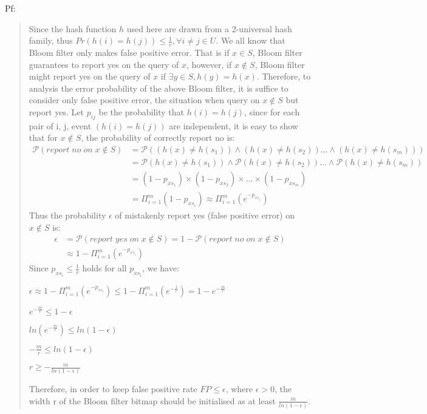 \documentclass[12pt]{article}
\begin{document}
Pf: 
\begin{quote}
Since the hash function $h$ used here are drawn from a 2-universal hash family, thus $Pr(h(i) = h(j)) \leq \frac{1}{r}, \forall i \neq j \in U$. We all know that Bloom filter only makes false positive error. That is if $x \in S$, Bloom filter guarantees to report yes on the query of $x$, however, if $x \notin S$, Bloom filter might report yes on the query of $x$ if $\exists y \in S, h(y) = h(x)$. Therefore, to analysis the error probability of the above Bloom filter, it is suffice to consider only false positive error, the situation when query on $x \notin S$ but report yes. Let $p_{ij}$ be the probability that $h(i) = h(j)$, since for each pair of i, j, event $(h(i) = h(j))$ are independent, it is easy to show that for $x \notin S$, the probability of correctly report no is:
\begin{equation}
\begin{aligned}
\mathcal{P}(report \; no \; on \; x \notin S) &= \mathcal{P}((h(x) \neq h(s_1)) \land (h(x) \neq h(s_2)) \dots \land (h(x) \neq h(s_m))) \\
&=  \mathcal{P}(h(x) \neq h(s_1)) \land \mathcal{P}(h(x) \neq h(s_2)) \dots \land \mathcal{P}(h(x) \neq h(s_m))\\
&= (1-p_{xs_1}) \times (1-p_{xs_2}) \times \dots \times (1-p_{xs_m}) \\ 
&= \Pi_{i=1}^m(1-p_{xs_i}) \approx \Pi_{i=1}^m(e^{-p_{xs_i}})
\end{aligned}
\end{equation}
Thus the probability $\epsilon$ of mistakenly report yes (false positive error) on $x \notin S$ is:
\begin{equation}
\begin{aligned}
\epsilon &= \mathcal{P}(report \; yes \; on \; x \notin S) = 1 - \mathcal{P}(report \; no \; on \; x \notin S) \\
&\approx  1 - \Pi_{i=1}^m(e^{-p_{xs_i}})
\end{aligned}
\end{equation}
Since $p_{xs_i} \leq \frac{1}{r}$ holds for all $p_{xs_i}$, we have:
\begin{center}
$\epsilon \approx 1 - \Pi_{i=1}^m(e^{-p_{xs_i}}) \leq 1 - \Pi_{i=1}^m(e^{-\frac{1}{r}}) = 1 - e^{-\frac{m}{r}}$ 

$e^{-\frac{m}{r}} \leq 1 - \epsilon$

$ln(e^{-\frac{m}{r}}) \leq ln(1 - \epsilon)$

$-\frac{m}{r} \leq ln(1 - \epsilon)$

$r \geq -\frac{m}{ln(1 - \epsilon)}$
\end{center}
Therefore, in order to keep false positive rate $FP \leq \epsilon$, where $\epsilon > 0$, the width r of the Bloom filter bitmap should be initialised as at least $\frac{m}{ln(1 - \epsilon)}$.
\end{quote}
\end{document}
